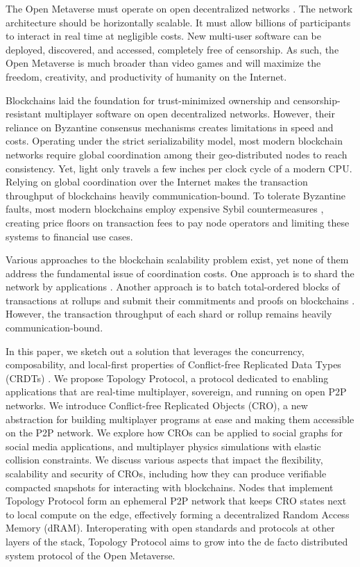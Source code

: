 \documentclass{article}
\begin{document}
The Open Metaverse must operate on open decentralized networks \cite{SIGGRAPH}. The network architecture should be horizontally scalable. It must allow billions of participants to interact in real time at negligible costs. New multi-user software can be deployed, discovered, and accessed, completely free of censorship. As such, the Open Metaverse is much broader than video games and will maximize the freedom, creativity, and productivity of humanity on the Internet.

Blockchains laid the foundation for trust-minimized ownership and censorship-resistant multiplayer software on open decentralized networks. However, their reliance on Byzantine consensus mechanisms creates limitations in speed and costs. Operating under the strict serializability model, most modern blockchain networks require global coordination among their geo-distributed nodes to reach consistency. Yet, light only travels a few inches per clock cycle of a modern CPU. Relying on global coordination over the Internet makes the transaction throughput of blockchains heavily communication-bound. To tolerate Byzantine faults, most modern blockchains employ expensive Sybil countermeasures \cite{Tendermint,Casper}, creating price floors on transaction fees to pay node operators and limiting these systems to financial use cases.

Various approaches to the blockchain scalability problem exist, yet none of them address the fundamental issue of coordination costs. One approach is to shard the network by applications \cite{Cosmos, RGB}. Another approach is to batch total-ordered blocks of transactions at rollups and submit their commitments and proofs on blockchains \cite{Rollup}. However, the transaction throughput of each shard or rollup remains heavily communication-bound.

In this paper, we sketch out a solution that leverages the concurrency, composability, and local-first \cite{LoFi} properties of Conflict-free Replicated Data Types (CRDTs) \cite{CRDT}. We propose Topology Protocol, a protocol dedicated to enabling applications that are real-time multiplayer, sovereign, and running on open P2P networks. We introduce Conflict-free Replicated Objects (CRO), a new abstraction for building multiplayer programs at ease and making them accessible on the P2P network. We explore how CROs can be applied to social graphs for social media applications, and multiplayer physics simulations with elastic collision constraints. We discuss various aspects that impact the flexibility, scalability and security of CROs, including how they can produce verifiable compacted snapshots for interacting with blockchains. Nodes that implement Topology Protocol form an ephemeral P2P network that keeps CRO states next to local compute on the edge, effectively forming a decentralized Random Access Memory (dRAM). Interoperating with open standards and protocols at other layers of the stack, Topology Protocol aims to grow into the de facto distributed system protocol of the Open Metaverse.
\end{document}
